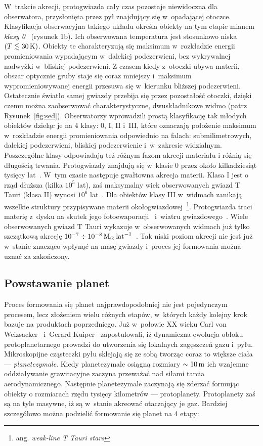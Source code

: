 W~trakcie akrecji, protogwiazda cały czas pozostaje niewidoczna dla obserwatora,
przysłonięta przez pył znajdujący się w~opadającej otoczce. Klasyfikacja
obserwacyjna takiego układu określa obiekty na tym etapie mianem \emph{klasy
0}~\cite{andre} (rysunek 1b). Ich obserwowana temperatura jest stosunkowo niska
$(T \lesssim 30\hbox{$\thinspace\textrm{K}$})$. Obiekty te charakteryzują się maksimum w~rozkładzie
energii promieniowania wypadającym w~dalekiej podczerwieni, bez wykrywalnej
nadwyżki w~bliskiej podczerwieni. Z czasem kiedy z~otoczki ubywa materii,
obszar optycznie gruby staje się coraz mniejszy i~maksimum wypromieniowywanej
energii przesuwa się w~kierunku bliższej podczerwieni. Ostatecznie
światło samej gwiazdy przebija się przez pozostałość otoczki, dzięki czemu można
zaobserwować charakterystyczne, dwuskładnikowe widmo (patrz
Rysunek~\ref{fig:sed}). Obserwatorzy wprowadzili prostą klasyfikację tak młodych
obiektów dzieląc je na 4 klasy: 0, I, II i~III, które oznaczają położenie
maksimum w~rozkładzie energii promieniowania odpowiednio na falach:
submilimetrowych, dalekiej podczerwieni, bliskiej podczerwienie i~w~zakresie
widzialnym. Poszczególne klasy odpowiadają też różnym fazom akrecji materiału i
różnią się długością trwania. Protogwiazdy znajdują się w~klasie 0 przez około
kilkadziesiąt tysięcy lat~\cite{FSSK06}. W~tym czasie następuje gwałtowna
akrecja materii.  Klasa I jest o rząd dłuższa (kilka $10^5$ lat), zaś maksymalny
wiek obserwowanych gwiazd T Tauri (klasa II) wynosi $10^6$ lat~\cite{HCGD98}.
Dla obiektów klasy III w~widmach zanikają wszelkie struktury
przypisywane materii okołogwiazdowej~\footnote{ang. \emph{weak-line T Tauri
stars}}. Protogwiazda traci materię z~dysku na skutek jego
fotoewaporacji~\cite{ACP06} i~wiatru gwiazdowego~\cite{PN86}. Wiele
obserwowanych gwiazd T Tauri wykazuje w~obserwowanych widmach już tylko
szczątkową akrecję $10^{-7} \div 10^{-8} \hbox{$\mathrm{\thinspace M_{\odot}}$}\hbox{$\thinspace\textrm{lat}$}^{-1}$~\cite{Hart98}. Tak niski
poziom akrecji nie jest już w~stanie znacząco wpłynąć na masę gwiazdy i~proces
jej formowania można uznać za zakończony.

\subsection{Powstawanie planet}

Proces formowania się planet najprawdopodobniej nie jest pojedynczym procesem,
lecz złożeniem wielu różnych etapów, w~których każdy kolejny krok bazuje na
produktach poprzedniego. Już w~połowie XX wieku Carl von
Weizsacker~\cite*{1943ZA.....22..319W} i~Gerard
Kuiper~\cite*{1951PNAS...37....1K} zapostulowali, iż dynamiczna ewolucja obłoku
protoplanetarnego prowadzi do utworzenia się lokalnych zagęszczeń gazu i~pyłu.
Mikroskopijne cząsteczki pyłu sklejają się ze sobą tworząc coraz to większe
ciała --- \emph{planetezymale}. Kiedy planetezymale osiągną rozmiary $\sim 10\hbox{$\thinspace\textrm{m}$}$
ich wzajemne oddziaływanie grawitacyjne zaczyna przeważać nad siłami tarcia
aerodynamicznego. Następnie planetezymale zaczynają się zderzać formując obiekty
o rozmiarach rzędu tysięcy kilometrów --- protoplanety. Protoplanety zaś są na
tyle masywne, iż są w~stanie akreować otaczający je gaz. Bardziej szczegółowo
można podzielić formowanie się planet na 4 etapy:

